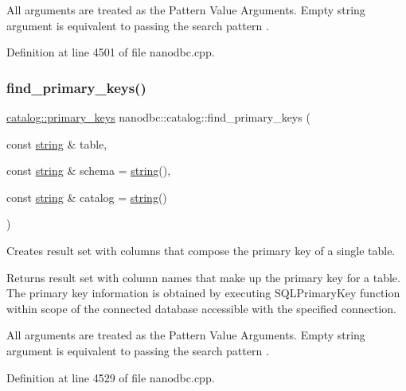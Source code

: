 All arguments are treated as the Pattern Value Arguments. Empty string argument is equivalent to passing the search pattern \textquotesingle{}\textquotesingle{}. 

Definition at line 4501 of file nanodbc.\+cpp.

\mbox{\label{classnanodbc_1_1catalog_a611a69c39c361e1902df3bf9a793a638}} 
\subsubsection{\texorpdfstring{find\_primary\_keys()}{find\_primary\_keys()}}
{\footnotesize\ttfamily \mbox{\hyperlink{classnanodbc_1_1catalog_1_1primary__keys}{catalog\+::primary\+\_\+keys}} nanodbc\+::catalog\+::find\+\_\+primary\+\_\+keys (\begin{DoxyParamCaption}\item[{const \mbox{\hyperlink{namespacenanodbc_abfc0ece56278e590911ec8352774c212}{string}} \&}]{table,  }\item[{const \mbox{\hyperlink{namespacenanodbc_abfc0ece56278e590911ec8352774c212}{string}} \&}]{schema = {\ttfamily \mbox{\hyperlink{namespacenanodbc_abfc0ece56278e590911ec8352774c212}{string}}()},  }\item[{const \mbox{\hyperlink{namespacenanodbc_abfc0ece56278e590911ec8352774c212}{string}} \&}]{catalog = {\ttfamily \mbox{\hyperlink{namespacenanodbc_abfc0ece56278e590911ec8352774c212}{string}}()} }\end{DoxyParamCaption})}



Creates result set with columns that compose the primary key of a single table. 

Returns result set with column names that make up the primary key for a table. The primary key information is obtained by executing {\ttfamily S\+Q\+L\+Primary\+Key} function within scope of the connected database accessible with the specified connection.

All arguments are treated as the Pattern Value Arguments. Empty string argument is equivalent to passing the search pattern \textquotesingle{}\textquotesingle{}. 

Definition at line 4529 of file nanodbc.\+cpp.

\mbox{\label{classnanodbc_1_1catalog_a4fdba40e8bf0101d68484dd12ac520db}} 
